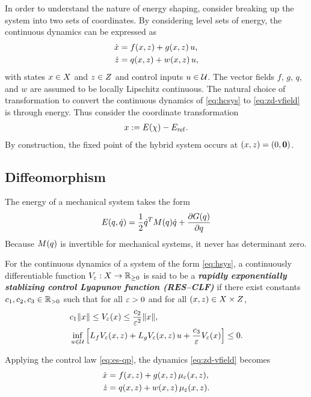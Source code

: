 \documentclass[twocolumn]{article}
\begin{document}
In order to understand the nature of energy shaping, consider breaking up the system into two sets of coordinates.
%
By considering level sets of energy, the continuous dynamics can be expressed as
\begin{align}
  \nonumber
  \dot {x} &= f(x, z) + g(x, z) \, u,\\
  \dot {z} &= q(x, z) + w(x, z) \, u,
  \label{eq:zd-vfield}
\end{align}
%
with states $x \in X$ and $z \in Z$ and control inputs $u \in \mathcal{U}$.
%
The vector fields $f$, $g$, $q$, and $w$ are assumed to be locally Lipschitz continuous.
%
The natural choice of transformation to convert the continuous dynamics of \eqref{eq:hcsys} to \eqref{eq:zd-vfield} is through energy.
%
Thus consider the coordinate transformation
\begin{align}
  x := E(\chi) - E_{\mathrm{ref}}.
\end{align}
By construction, the fixed point of the hybrid system occurs at $(x, z) = (0, {\mathbf 0})$.
%

\subsection{Diffeomorphism}
The energy of a mechanical system takes the form
\begin{align}
  E(q, \dot{q}) = \frac{1}{2} \dot{q}^{T} M(q) \dot{q} + \frac{\partial{G(q)}}{\partial{q}}
\end{align}
Because $M(q)$ is invertible for mechanical systems, it never has determinant zero.

\begin{definition}
  For the continuous dynamics of a system of the form \eqref{eq:hsys}, a continuously differentiable function $V_{\varepsilon} : X \to \mathbb{R}_{\geq 0}$ is said to be a {\bf \em rapidly exponentially stablizing control Lyapunov function (RES--CLF)} if there exist constants $c_{1}, c_{2}, c_{3} \in \mathbb{R}_{> 0}$ such that for all $\varepsilon > 0$ and for all $(x, z) \in X \times Z$,
  \begin{align}
    &c_{1} \|x\| \leq V_{\varepsilon}(x) \leq \frac{c_{2}}{\varepsilon^{2}} \|x\|,\\
    \nonumber
    &\inf_{u \in \mathcal{U}} \left[ L_{f} V_{\varepsilon}(x, z) + L_{g} V_{\varepsilon}(x, z) \, u + \frac{c_{3}}{\varepsilon} V_{\varepsilon}(x) \right] \leq 0.
  \end{align}
\end{definition}


Applying the control law \eqref{eq:es-qp}, the dynamics \eqref{eq:zd-vfield} becomes
\begin{align}
  \nonumber
  \dot {x} &= f(x, z) + g(x, z) \, \mu_{\varepsilon}(x, z),\\
  \dot {z} &= q(x, z) + w(x, z) \, \mu_{\varepsilon}(x, z).
  \label{eq:zd-vfield-cl}
\end{align}
\end{document}
